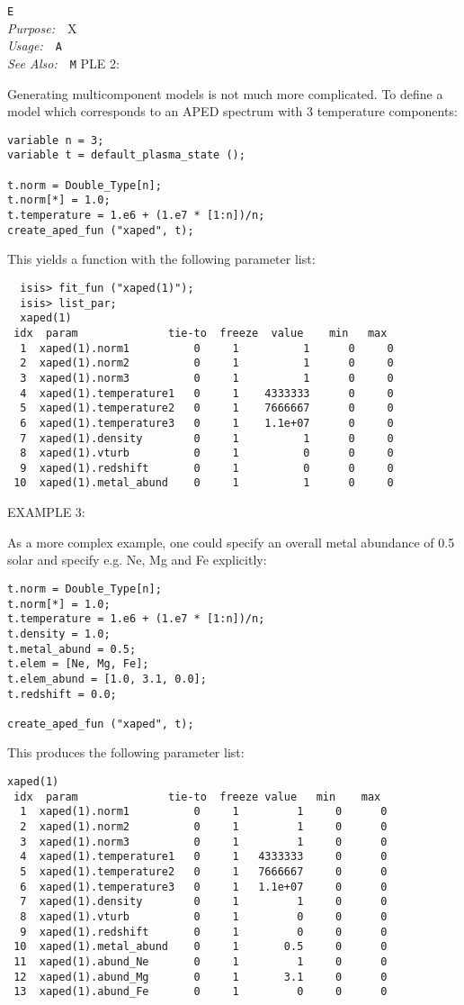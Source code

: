 \documentclass{book}
\makeatletter
\newif\ifpdf
\newenvironment{isisfunction}[4]%
{\index{{#1}@{\tt #1}}%
  \ifpdf
  \else
     \addcontentsline{toc}{subsection}{{#1} -- {#2}}
  \fi
  \vbox{
          \vspace*{\baselineskip}
          {\LARGE\tt #1}\vspace*{\baselineskip}\\
          {{\it Purpose:}~~{#2}}\\
          {{\it Usage:}~~{\tt #3}}\\
          {{\it See Also:}~~{\tt #4}}
       }
}%
{ }
\makeatother
\begin{document}
{\begin{isisfunction}
EXAMPLE 2:

Generating multicomponent models is not much more complicated. To
define a model which corresponds to an APED spectrum with 3
temperature components:
\begin{verbatim}
variable n = 3;
variable t = default_plasma_state ();

t.norm = Double_Type[n];
t.norm[*] = 1.0;
t.temperature = 1.e6 + (1.e7 * [1:n])/n;
create_aped_fun ("xaped", t);
\end{verbatim}

This yields a function with the following parameter list:
\begin{verbatim}
  isis> fit_fun ("xaped(1)");
  isis> list_par;
  xaped(1)
 idx  param              tie-to  freeze  value    min   max
  1  xaped(1).norm1          0     1          1      0     0
  2  xaped(1).norm2          0     1          1      0     0
  3  xaped(1).norm3          0     1          1      0     0
  4  xaped(1).temperature1   0     1    4333333      0     0
  5  xaped(1).temperature2   0     1    7666667      0     0
  6  xaped(1).temperature3   0     1    1.1e+07      0     0
  7  xaped(1).density        0     1          1      0     0
  8  xaped(1).vturb          0     1          0      0     0
  9  xaped(1).redshift       0     1          0      0     0
 10  xaped(1).metal_abund    0     1          1      0     0
\end{verbatim}

EXAMPLE 3:

As a more complex example, one could specify an overall metal
abundance of 0.5 solar and specify e.g. Ne, Mg and Fe explicitly:

\begin{verbatim}
t.norm = Double_Type[n];
t.norm[*] = 1.0;
t.temperature = 1.e6 + (1.e7 * [1:n])/n;
t.density = 1.0;
t.metal_abund = 0.5;
t.elem = [Ne, Mg, Fe];
t.elem_abund = [1.0, 3.1, 0.0];
t.redshift = 0.0;

create_aped_fun ("xaped", t);
\end{verbatim}

This produces the following parameter list:
\begin{verbatim}
xaped(1)
 idx  param              tie-to  freeze value   min    max
  1  xaped(1).norm1          0     1         1     0      0
  2  xaped(1).norm2          0     1         1     0      0
  3  xaped(1).norm3          0     1         1     0      0
  4  xaped(1).temperature1   0     1   4333333     0      0
  5  xaped(1).temperature2   0     1   7666667     0      0
  6  xaped(1).temperature3   0     1   1.1e+07     0      0
  7  xaped(1).density        0     1         1     0      0
  8  xaped(1).vturb          0     1         0     0      0
  9  xaped(1).redshift       0     1         0     0      0
 10  xaped(1).metal_abund    0     1       0.5     0      0
 11  xaped(1).abund_Ne       0     1         1     0      0
 12  xaped(1).abund_Mg       0     1       3.1     0      0
 13  xaped(1).abund_Fe       0     1         0     0      0
\end{verbatim}


\end{isisfunction}}
\end{document}
